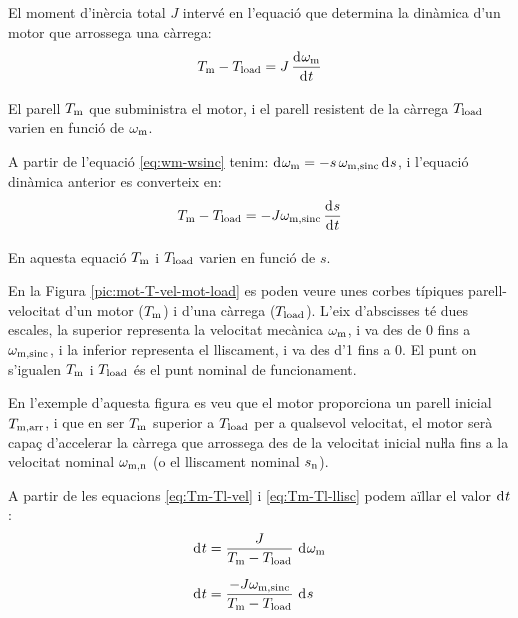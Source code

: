 El moment d'inèrcia total $J$ intervé en l'equació que  determina la dinàmica d'un motor que arrossega una càrrega:
\begin{equation}\label{eq:Tm-Tl-vel}
    T\ped{m} - T\ped{load} = J\,\frac{\diff \omega\ped{m}}{\diff t}
\end{equation}

El parell $T_\mathrm{m}$ que subministra el motor, i el parell resistent de la càrrega $T_\mathrm{load}$ varien en funció de $\omega_\mathrm{m}$.

A partir de l'equació \eqref{eq:wm-wsinc} tenim: $\diff \omega\ped{m} = -s\,\omega\ped{m,sinc} \diff s$, i l'equació dinàmica anterior es converteix en:
\begin{equation}\label{eq:Tm-Tl-llisc}
    T\ped{m} - T\ped{load} = -J \omega\ped{m,sinc}\,\frac{\diff s}{\diff t}
\end{equation}

En aquesta equació $T_\mathrm{m}$ i $T_\mathrm{load}$ varien en funció de $s$.


En la Figura \vref{pic:mot-T-vel-mot-load} es poden veure unes corbes típiques parell-velocitat d'un motor ($T_\mathrm{m}$) i d'una  càrrega ($T_\mathrm{load}$). L'eix d'abscisses té dues escales, la superior representa la velocitat mecànica $\omega_\mathrm{m}$, i va des de 0 fins a $\omega_\mathrm{m,sinc}$, i la inferior representa el lliscament, i va des d'1 fins a 0. El punt on s'igualen $T_\mathrm{m}$ i $T_\mathrm{load}$ és el punt nominal de funcionament.

En l'exemple d'aquesta figura es veu que el motor proporciona un parell inicial $T_\mathrm{m,arr}$, i que en ser $T_\mathrm{m}$  superior a $T_\mathrm{load}$ per a qualsevol velocitat, el motor serà  capaç d'accelerar la càrrega que arrossega des de la velocitat inicial nuŀla fins a la velocitat nominal $\omega_\mathrm{m,n}$ (o el lliscament nominal $s_\mathrm{n}$).
\begin{center}
    
    \label{pic:mot-T-vel-mot-load}
\end{center}

A partir de les equacions \eqref{eq:Tm-Tl-vel} i \eqref{eq:Tm-Tl-llisc} podem aïllar el valor $\diff t$:
\begin{subequations}
\begin{align}
    \diff t &= \frac{J}{T\ped{m}-T\ped{load}}\,\diff\omega\ped{m}\\[1.5ex]
    \diff t &= \frac{-J \omega\ped{m,sinc}}{T\ped{m}-T\ped{load}}\,\diff s
\end{align}
\end{subequations}


